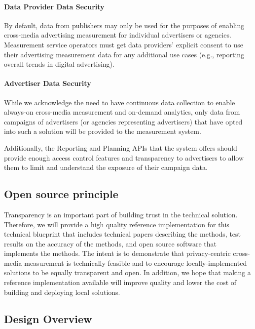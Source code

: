 \documentclass[]{article}
\let\oldparagraph\paragraph
\renewcommand{\paragraph}[1]{\oldparagraph{#1}\mbox{}}
\begin{document}
\paragraph{Data Provider Data Security}

By default, data from publishers may only be used for the purposes of enabling cross-media advertising measurement for individual advertisers or agencies. Measurement service operators must get data providers' explicit consent to use their advertising measurement data for any additional use cases (e.g., reporting overall trends in digital advertising).


\paragraph{Advertiser Data Security}

While we acknowledge the need to have continuous data collection to enable always-on cross-media measurement and on-demand analytics, only data from campaigns of advertisers (or agencies representing advertisers) that have opted into such a solution will be provided to the measurement system.

Additionally, the Reporting and Planning APIs that the system offers should provide enough access control features and transparency to advertisers to allow them to limit and understand the exposure of their campaign data.


\subsection{Open source principle}

Transparency is an important part of building trust in the technical solution. Therefore, we will provide a high quality reference implementation for this technical blueprint that includes technical papers describing the methods, test results on the accuracy of the methods, and open source software that implements the methods. The intent is to demonstrate that privacy-centric cross-media measurement is technically feasible and to encourage locally-implemented solutions to be equally transparent and open. In addition, we hope that making a reference implementation available will improve quality and lower the cost of building and deploying local solutions.


\subsection{Design Overview}
\end{document}

